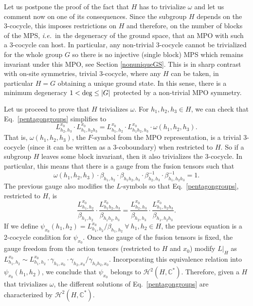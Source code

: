 \documentclass[a4paper,twocolumn,11pt,accepted=2023-02-10]{quantumarticle}
\begin{document}
Let us postpone the proof of the fact that $H$ has to trivialize $\omega$ and let us comment now on one of its consequences. Since the subgroup $H$ depends on the 3-cocycle, this imposes restrictions on $H$ and therefore, on the number of blocks of the MPS, {\it i.e.}\ in the degeneracy of the ground space, that an MPO with such a 3-cocycle can host. In particular, any non-trivial 3-cocycle cannot be trivialized for the whole group $G$ so there is no injective (single block) MPS which remains  invariant under this MPO, see Section \ref{nonuniqueGS}. This is in sharp contrast with on-site symmetries, trivial 3-cocycle, where any $H$ can be taken, in particular $H=G$ obtaining a unique ground state. In this sense, there is a minimum degeneracy $1 < {\rm deg }\le |G| $ protected by a non-trivial MPO symmetry.

Let us proceed to prove that $H$ trivializes $\omega$.  For $h_1,h_2,h_3 \in H$, we can check that Eq.\ \eqref{pentagongroups} simplifies to 
\begin{equation*}
{L}^{x_0}_{h_2,h_3} {\cdot} {L}^{x_0}_{h_1,h_2h_3}  
=  {L}^{x_0}_{h_1,h_2} {\cdot} {L}^{x_0}_{h_1h_2,h_3}{\cdot} \omega(h_1,h_2,h_3).
\end{equation*}
That is, $\omega(h_1,h_2,h_3)$, the ${F}$-symbol from the MPO representation, is a trivial 3-cocycle (since it can be written as a 3-coboundary) when restricted to $H$. So if a subgroup $H$ leaves some block invariant, then it also trivializes the 3-cocycle. In particular, this means that there is a gauge from the fusion tensors such that
$$ \omega(h_1,h_2,h_3){\cdot} \beta_{h_1,h_2}{\cdot}  \beta_{h_1h_2,h_3}{\cdot} \beta^{-1}_{h_2,h_3} {\cdot} \beta^{-1}_{h_1,h_2h_3} =1.$$ 
The previous gauge also modifies the ${L}$-symbols so that Eq.\ \eqref{pentagongroups}, restricted to $H$, is
$$\frac{{L}^{x_0}_{h_1,h_2}}{\beta_{h_1,h_2}}  {\cdot} \frac{{L}^{x_0}_{h_1h_2,h_3}}{\beta_{h_1h_2,h_3}}   =   \frac{{L}^{x_0}_{h_2,h_3}}{\beta_{h_2,h_3}}  {\cdot} \frac{{L}^{x_0}_{h_1,h_2h_3}}{\beta_{h_1,h_2h_3}} .$$
If we define $\psi_{x_0}(h_1,h_2) = {{L}^{x_0}_{h_1,h_2}}/{\beta_{h_1,h_2}} \ \forall \ h_1,h_2\in H$, the previous equation is a 2-cocycle condition for $\psi_{x_0}$. Once the gauge of the fusion tensors is fixed, the gauge freedom from the action tensors (restricted to $H$ and $x_0$) modify ${L}|_H$ as ${L}^{x_0}_{h_1,h_2} \sim {L}^{x_0}_{h_1,h_2}{\cdot}  \gamma_{h_1,{x_0}} {\cdot} \gamma_{h_2,{x_0}}/\gamma_{h_1h_2,{x_0}}$. Incorporating this equivalence relation into $\psi_{x_0}(h_1,h_2)$, we conclude that $\psi_{x_0}$ belongs to $\mathcal{H}^2(H,\mathbb{C}^*)$. Therefore, given a $H$ that trivializes $\omega$, the different solutions of Eq.\ \eqref{pentagongroups} are characterized by $\mathcal{H}^2(H,\mathbb{C}^*)$. 
\end{document}
